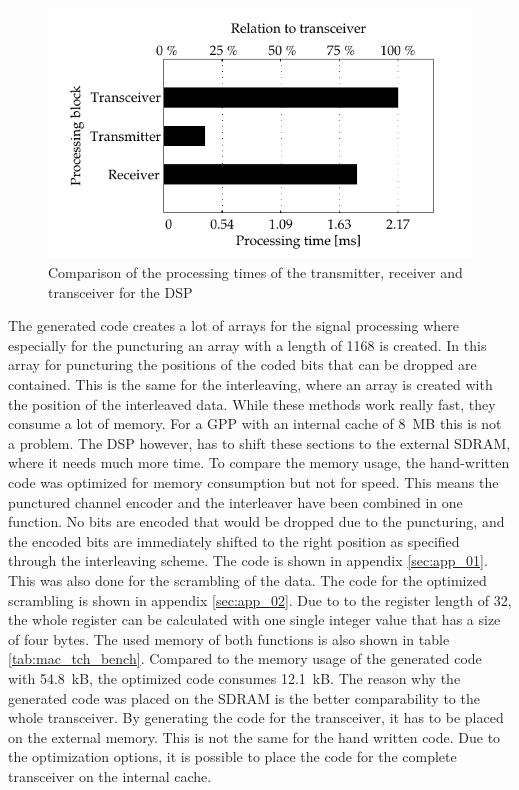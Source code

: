 \begin{figure}[htb]
	\centering
		\includegraphics{../kapitel05/figures/bench_dsp_trx.pdf}
	\caption{Comparison of the processing times of the transmitter, receiver and transceiver for the DSP}
	\label{fig:bench_dsp_trx}
\end{figure}

The generated code creates a lot of arrays for the signal processing where especially for the puncturing an array with a length of 1168 is created. In this array for puncturing the positions of the coded bits that can be dropped are contained. This is the same for the interleaving, where an array is created with the position of the interleaved data. While these methods work really fast, they consume a lot of memory. For a GPP with an internal cache of \SI{8}{MB} this is not a problem. The DSP however, has to shift these sections to the external SDRAM, where it needs much more time. To compare the memory usage, the hand-written code was optimized for memory consumption but not for speed. This means the punctured channel encoder and the interleaver have been combined in one function. No bits are encoded that would be dropped due to the puncturing, and the encoded bits are immediately shifted to the right position as specified through the interleaving scheme. The code is shown in appendix \ref{sec:app_01}. This was also done for the scrambling of the data. The code for the optimized scrambling is shown in appendix \ref{sec:app_02}. Due to to the register length of 32, the whole register can be calculated with one single integer value that has a size of four bytes. The used memory of both functions is also shown in table \ref{tab:mac_tch_bench}. Compared to the memory usage of the generated code with \SI{54.8}{kB}, the optimized code consumes \SI{12.1}{kB}. The reason why the generated code was placed on the SDRAM is the better comparability to the whole transceiver. By generating the code for the transceiver, it has to be placed on the external memory. This is not the same for the hand written code. Due to the optimization options, it is possible to place the code for the complete transceiver on the internal cache.  


